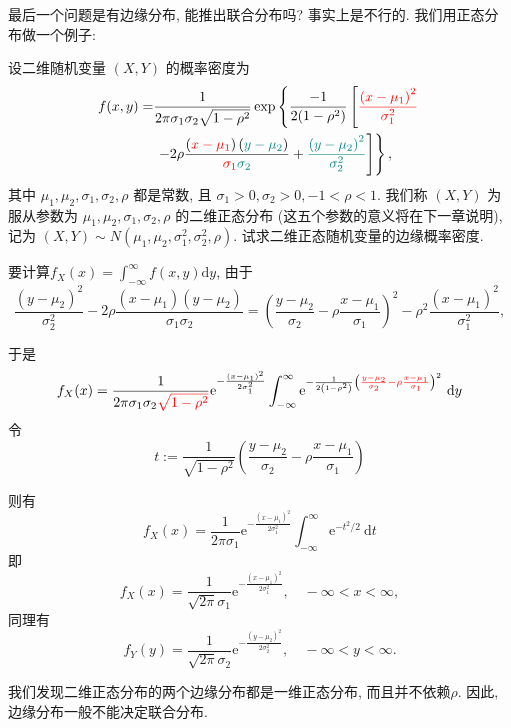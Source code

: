   最后一个问题是有边缘分布, 能推出联合分布吗? 事实上是不行的. 我们用正态分布做一个例子: 

  \begin{example}
    设二维随机变量 $(X, Y)$ 的概率密度为
    $$
        \begin{aligned}
            f(x, y)= &
            \frac{1}{2 \pi \sigma_1 \sigma_2 \sqrt{1-\rho^2}}
            \exp \left\{
            \frac { - 1 } { 2 ( 1 - \rho ^ { 2 } ) }
            \left[{\color{red}\frac{\left(x-\mu_1\right)^2}{\sigma_1^2}}\right.\right. \\
                     & \left.\left.-2 \rho
            \frac{\left({\color{red}x-\mu_1}\right)\left({\color{teal}y-\mu_2}\right)}{{\color{red}\sigma_1} {\color{teal}\sigma_2}}
            +{\color{teal}\frac{\left(y-\mu_2\right)^2}{\sigma_2^2}}\right]\right\},
        \end{aligned}
    $$
    其中 $\mu_1, \mu_2, \sigma_1, \sigma_2, \rho$ 都是常数, 且 $\sigma_1>0, \sigma_2>0,-1<\rho<1$. 我们称 $(X, Y)$ 为服从参数为 $\mu_1, \mu_2, \sigma_1, \sigma_2, \rho$ 的二维正态分布 (这五个参数的意义将在下一章说明), 记为 $(X, Y) \sim N\left(\mu_1, \mu_2, \sigma_1^2, \sigma_2^2, \rho\right)$. 试求二维正态随机变量的边缘概率密度.
\end{example}

\begin{solution}
  要计算$f_X(x)=\int_{-\infty}^{\infty} f(x, y) \mathrm{d} y$, 由于
            $$\frac{\left(y-\mu_2\right)^2}{\sigma_2^2}-2 \rho \frac{\left(x-\mu_1\right)\left(y-\mu_2\right)}{\sigma_1 \sigma_2}=\left(\frac{y-\mu_2}{\sigma_2}-\rho \frac{x-\mu_1}{\sigma_1}\right)^2-\rho^2 \frac{\left(x-\mu_1\right)^2}{\sigma_1^2},$$

            于是$$f_X(x)=\frac{1}{2 \pi \sigma_1 \sigma_2 {\color{red}\sqrt{1-\rho^2}}} \mathrm{e}^{-\frac{\left(x-\mu_1\right)^2}{2 \sigma_1^2}} \int_{-\infty}^{\infty} \mathrm{e}^{-\frac{1}{2\left(1-\rho^2\right)}\left({\color{red}\frac{y-\mu_2}{\sigma_2}-\rho \frac{x-\mu_1}{\sigma_1}}\right)^2} \mathrm{~d} y$$
        令 $$t:=\frac{1}{\sqrt{1-\rho^2}}\left(\frac{y-\mu_2}{\sigma_2}-\rho \frac{x-\mu_1}{\sigma_1}\right)$$

        则有$$f_X(x)=\frac{1}{2 \pi \sigma_1} \mathrm{e}^{-\frac{\left(x-\mu_1\right)^2}{2 \sigma_1^2}} \int_{-\infty}^{\infty} \mathrm{e}^{-t^2 / 2} \mathrm{~d} t$$
        即 $$f_X(x)=\frac{1}{\sqrt{2 \pi} \sigma_1} \mathrm{e}^{-\frac{\left(x-\mu_1\right)^2}{2 \sigma_1^2}}, \quad-\infty<x<\infty,$$
        同理有
         $$f_Y(y)=\frac{1}{\sqrt{2 \pi} \sigma_2} \mathrm{e}^{-\frac{\left(y-\mu_2\right)^2}{2 \sigma_2^2}}, \quad-\infty<y<\infty.$$

        我们发现二维正态分布的两个边缘分布都是一维正态分布, 而且并不依赖$\rho$. 
        因此, 边缘分布一般不能决定联合分布. 
\end{solution}

